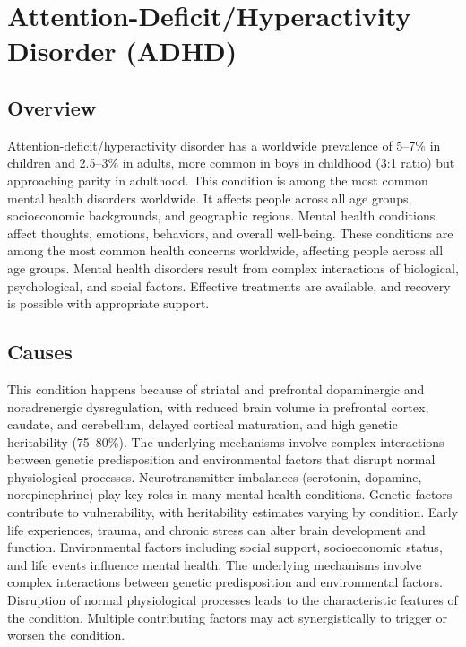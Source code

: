 \chapter{Attention-Deficit/Hyperactivity Disorder (ADHD)}
\label{sec:Attention-Deficit/Hyperactivity Disorder (ADHD)}

\section{Overview}
Attention-deficit/hyperactivity disorder has a worldwide prevalence of 5--7\% in children and 2.5--3\% in adults, more common in boys in childhood (3:1 ratio) but approaching parity in adulthood. This condition is among the most common mental health disorders worldwide. It affects people across all age groups, socioeconomic backgrounds, and geographic regions. Mental health conditions affect thoughts, emotions, behaviors, and overall well-being. These conditions are among the most common health concerns worldwide, affecting people across all age groups. Mental health disorders result from complex interactions of biological, psychological, and social factors. Effective treatments are available, and recovery is possible with appropriate support.
\section{Causes}
This condition happens because of striatal and prefrontal dopaminergic and noradrenergic dysregulation, with reduced brain volume in prefrontal cortex, caudate, and cerebellum, delayed cortical maturation, and high genetic heritability (75--80\%). The underlying mechanisms involve complex interactions between genetic predisposition and environmental factors that disrupt normal physiological processes. Neurotransmitter imbalances (serotonin, dopamine, norepinephrine) play key roles in many mental health conditions. Genetic factors contribute to vulnerability, with heritability estimates varying by condition. Early life experiences, trauma, and chronic stress can alter brain development and function. Environmental factors including social support, socioeconomic status, and life events influence mental health. The underlying mechanisms involve complex interactions between genetic predisposition and environmental factors. Disruption of normal physiological processes leads to the characteristic features of the condition. Multiple contributing factors may act synergistically to trigger or worsen the condition.
